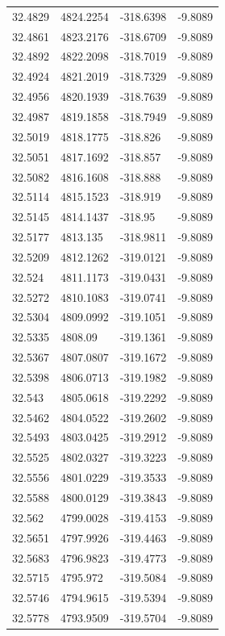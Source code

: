 \begin{table}[H]
\begin{tabular}{llll}
32.4829 & 4824.2254 & -318.6398 & -9.8089 \\
32.4861 & 4823.2176 & -318.6709 & -9.8089 \\
32.4892 & 4822.2098 & -318.7019 & -9.8089 \\
32.4924 & 4821.2019 & -318.7329 & -9.8089 \\
32.4956 & 4820.1939 & -318.7639 & -9.8089 \\
32.4987 & 4819.1858 & -318.7949 & -9.8089 \\
32.5019 & 4818.1775 & -318.826 & -9.8089 \\
32.5051 & 4817.1692 & -318.857 & -9.8089 \\
32.5082 & 4816.1608 & -318.888 & -9.8089 \\
32.5114 & 4815.1523 & -318.919 & -9.8089 \\
32.5145 & 4814.1437 & -318.95 & -9.8089 \\
32.5177 & 4813.135 & -318.9811 & -9.8089 \\
32.5209 & 4812.1262 & -319.0121 & -9.8089 \\
32.524 & 4811.1173 & -319.0431 & -9.8089 \\
32.5272 & 4810.1083 & -319.0741 & -9.8089 \\
32.5304 & 4809.0992 & -319.1051 & -9.8089 \\
32.5335 & 4808.09 & -319.1361 & -9.8089 \\
32.5367 & 4807.0807 & -319.1672 & -9.8089 \\
32.5398 & 4806.0713 & -319.1982 & -9.8089 \\
32.543 & 4805.0618 & -319.2292 & -9.8089 \\
32.5462 & 4804.0522 & -319.2602 & -9.8089 \\
32.5493 & 4803.0425 & -319.2912 & -9.8089 \\
32.5525 & 4802.0327 & -319.3223 & -9.8089 \\
32.5556 & 4801.0229 & -319.3533 & -9.8089 \\
32.5588 & 4800.0129 & -319.3843 & -9.8089 \\
32.562 & 4799.0028 & -319.4153 & -9.8089 \\
32.5651 & 4797.9926 & -319.4463 & -9.8089 \\
32.5683 & 4796.9823 & -319.4773 & -9.8089 \\
32.5715 & 4795.972 & -319.5084 & -9.8089 \\
32.5746 & 4794.9615 & -319.5394 & -9.8089 \\
32.5778 & 4793.9509 & -319.5704 & -9.8089 \\

\end{tabular}
\end{table}
